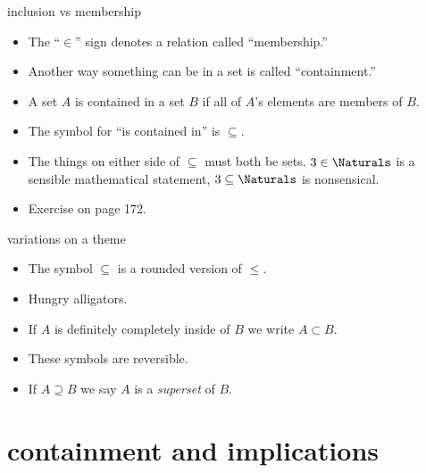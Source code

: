 \documentclass[handout,landscape]{beamer}
\begin{document}
\begin{frame}{inclusion vs membership}
\begin{itemize}
\item The ``$\in$'' sign denotes a relation called ``membership.'' \pause
\item Another way something can be in a set is called ``containment.'' \pause
\item A set $A$ is contained in a set $B$ if all of $A$'s elements are members of $B$. \pause
\item The symbol for ``is contained in'' is $\subseteq$. \pause
\item The things on either side of $\subseteq$ must both be sets. \pause \newline
$3 \in \Naturals$ is a sensible mathematical statement, \pause \newline
$3 \subseteq \Naturals$ is nonsensical. \pause
\item Exercise on page 172.
\end{itemize}
\end{frame}

\begin{frame}{variations on a theme}
\begin{itemize}
\item The symbol $\subseteq$ is a rounded version of $\leq$. \pause
\item Hungry alligators. \pause
\item If $A$ is definitely completely inside of $B$ we write $A \subset B$. \pause
\item These symbols are reversible.
\item If $A \supseteq B$ we say $A$ is a {\em superset} of $B$.
\end{itemize}
\end{frame}

\section{containment and implications}
\end{document}
